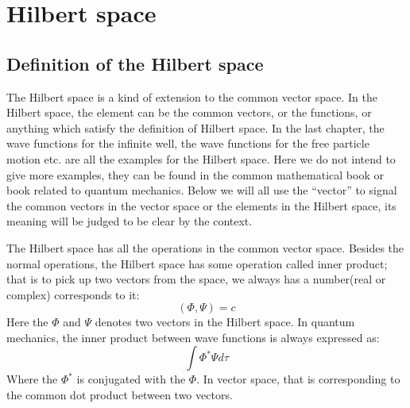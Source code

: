 %
%
%
%
%
%
%
%



\chapter{Hilbert space}
%
%
%
\section{Definition of the Hilbert space}
%
%


The Hilbert space is a kind of extension to the common vector space.
In the Hilbert space, the element can be the common vectors, or the
functions, or anything which satisfy the definition of Hilbert
space. In the last chapter, the wave functions for the infinite well,
the wave functions for the free particle motion etc. are all the
examples for the Hilbert space. Here we do not intend to give more
examples, they can be found in the common mathematical book or book
related to quantum mechanics. Below we will all use the ``vector'' to
signal the common vectors in the vector space or the elements in the
Hilbert space, its meaning will be judged to be clear by the context.

The Hilbert space has all the operations in the common vector space.
Besides the normal operations, the Hilbert space has some operation
called inner product; that is to pick up two vectors from the space,
we always has a number(real or complex) corresponds to it:
\begin{equation}\label{}
(\Phi,\Psi) = c
\end{equation}
Here the $\Phi$ and $\Psi$ denotes two vectors in the Hilbert space.
In quantum mechanics, the inner product between wave functions is
always expressed as:
\begin{equation}\label{}
\int\Phi^{*}\Psi d\tau
\end{equation}
Where the $\Phi^{*}$ is conjugated with the $\Phi$. In vector space,
that is corresponding to the common dot product between two vectors.

